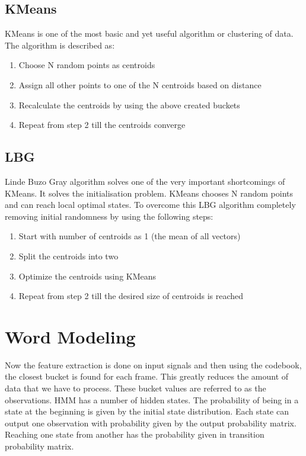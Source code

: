 \section{KMeans}
KMeans is one of the most basic and yet useful algorithm or clustering of data. The algorithm is described as:

\begin{enumerate}
\item Choose N random points as centroids
\item Assign all other points to one of the N centroids based on distance
\item Recalculate the centroids by using the above created buckets
\item Repeat from step 2 till the centroids converge
\end{enumerate}

\section{LBG}
Linde Buzo Gray algorithm solves one of the very important shortcomings of KMeans. It solves the initialisation problem. KMeans chooses N random points and can reach local optimal states. To overcome this LBG algorithm completely removing initial randomness by using the following steps:

\begin{enumerate}
    \item Start with number of centroids as 1 (the mean of all vectors)
    \item Split the centroids into two
    \item Optimize the centroids using KMeans
    \item Repeat from step 2 till the desired size of centroids is reached
\end{enumerate}

\chapter{Word Modeling}

Now the feature extraction is done on input signals and then using the codebook, the closest bucket is found for each frame. This greatly reduces the amount of data that we have to process. These bucket values are referred to as the observations. HMM has a number of hidden states. The probability of being in a state at the beginning is given by the initial state distribution. Each state can output one observation with probability given by the output probability matrix. Reaching one state from another has the probability given in transition probability matrix. 

